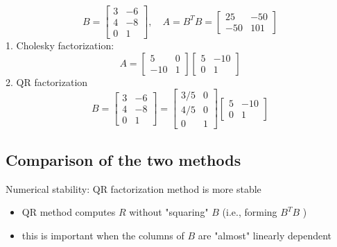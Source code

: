 \begin{example}
    \begin{equation}
B=\left[\begin{array}{rr}
3 & -6 \\
4 & -8 \\
0 & 1
\end{array}\right], \quad A=B^{T} B=\left[\begin{array}{rr}
25 & -50 \\
-50 & 101
\end{array}\right]
\end{equation}
1. Cholesky factorization:
\begin{equation}
A=\left[\begin{array}{rr}
5 & 0 \\
-10 & 1
\end{array}\right]\left[\begin{array}{rr}
5 & -10 \\
0 & 1
\end{array}\right]
\end{equation}
2. QR factorization
\begin{equation}
B=\left[\begin{array}{rr}
3 & -6 \\
4 & -8 \\
0 & 1
\end{array}\right]=\left[\begin{array}{rr}
3 / 5 & 0 \\
4 / 5 & 0 \\
0 & 1
\end{array}\right]\left[\begin{array}{rr}
5 & -10 \\
0 & 1
\end{array}\right]
\end{equation}
\end{example}

\subsection{Comparison of the two methods}

Numerical stability: QR factorization method is more stable

\begin{itemize}
    \item QR method computes $ R $ without "squaring" $ B $ (i.e., forming $ B^{T} B $ )
    \item this is important when the columns of $ B $ are "almost" linearly dependent
\end{itemize}

